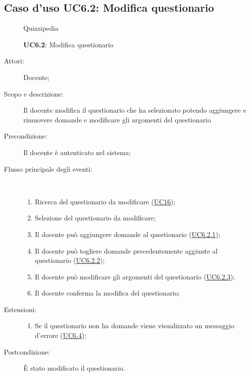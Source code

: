 \subsection{Caso d'uso UC6.2: Modifica questionario}
	\begin{figure}[H]
		\centering
		\begin{resizedtikzpicture}{\textwidth}
		\begin{umlsystem}[x=0, fill=lightgray!20]{Quizzipedia}
		\end{umlsystem}
		\end{resizedtikzpicture}
		\caption{\textbf{UC6.2}: Modifica questionario}
		\label{UC6.2}
	\end{figure}
\begin{description}
\item[Attori:] Docente;
\item[Scopo e descrizione:] Il docente modifica il questionario che ha selezionato potendo aggiungere e rimuovere domande e modificare gli argomenti del questionario
      \item[Precondizione:] Il docente è autenticato nel sistema;

        \item[Flusso principale degli eventi:] \ 
 \begin{enumerate}
          \item Ricerca del questionario da modificare (\hyperlink{UC16}{UC16});
          \item Selezione del questionario da modificare;
          \item Il docente può aggiungere domande al questionario (\hyperlink{UC6.2.1}{UC6.2.1});
          \item Il docente può togliere domande precedentemente aggiunte al questionario (\hyperlink{UC6.2.2}{UC6.2.2});
          \item Il docente può modificare gli argomenti del questionario (\hyperlink{UC6.2.3}{UC6.2.3});
          \item Il docente conferma la modifica del questionario;

      \end{enumerate}
    \item[Estensioni:]
      \begin{enumerate}
          \item Se il questionario non ha domande viene visualizzato un messaggio d'errore (\hyperlink{UC6.4}{UC6.4});

      \end{enumerate}
    \item[Postcondizione:] È stato modificato il questionario.
  \end{description}
\hypertarget{UC6.2.1}{}
